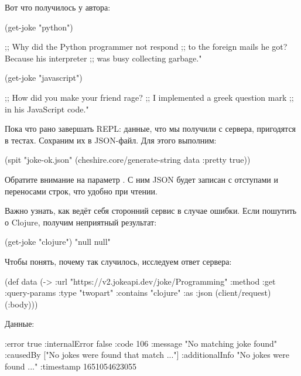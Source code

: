 \pagebreaklarge

Вот что получилось у автора:

\begin{english}
  \begin{clojure}
(get-joke "python")

;; Why did the Python programmer not respond
;; to the foreign mails he got? Because his interpreter
;; was busy collecting garbage."

(get-joke "javascript")

;; How did you make your friend rage?
;; I implemented a greek question mark
;; in his JavaScript code."
  \end{clojure}
\end{english}

Пока что рано завершать REPL: данные, что мы получили с сервера, пригодятся в тестах. Сохраним их в JSON-файл. Для этого выполним:

\begin{english}
  \begin{clojure/lines}
(spit "joke-ok.json"
      (cheshire.core/generate-string
       data {:pretty true}))
  \end{clojure/lines}
\end{english}

Обратите внимание на параметр  . С ним JSON будет записан с отступами и переносами строк, что удобно при чтении.

Важно узнать, как ведёт себя сторонний сервис в случае ошибки. Если пошутить о Clojure, получим неприятный результат:

\begin{english}
  \begin{clojure}
(get-joke "clojure")
"null null"
  \end{clojure}
\end{english}

Чтобы понять, почему так случилось, исследуем ответ сервера:

\begin{english}
  \begin{clojure}
(def data
  (-> {:url "https://v2.jokeapi.dev/joke/Programming"
       :method :get
       :query-params {:type "twopart" :contains "clojure"}
       :as :json}
      (client/request)
      (:body)))
  \end{clojure}
\end{english}

Данные:

\begin{english}
  \begin{clojure}
{:error true
 :internalError false
 :code 106
 :message "No matching joke found"
 :causedBy ["No jokes were found that match ..."]
 :additionalInfo "No jokes were found ..."
 :timestamp 1651054623055}
  \end{clojure}
\end{english}

